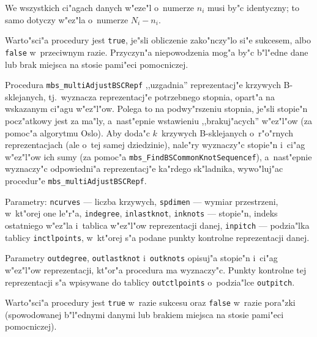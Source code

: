 We wszystkich ci"agach danych w"eze"l o~numerze $n_i$ musi by"c identyczny;
to samo dotyczy w"ez"la o~numerze $N_i-n_i$.

Warto"sci"a procedury jest \texttt{true}, je"sli obliczenie zako"nczy"lo
si"e sukcesem, albo \texttt{false} w~przeciwnym razie. Przyczyn"a
niepowodzenia mog"a by"c b"l"edne dane lub brak miejsca na stosie pami"eci
pomocniczej.

\vspace{\bigskipamount}
\begin{sloppypar}
Procedura \texttt{mbs\_multiAdjustBSCRepf} ,,uzgadnia'' reprezentacj"e
krzywych B-sklejanych, tj.\ wyznacza reprezentacj"e potrzebnego stopnia,
opart"a na wskazanym ci"agu w"ez"l"ow. Polega to na podwy"rszeniu stopnia,
je"sli stopie"n pocz"atkowy jest za ma"ly, a~nast"epnie wstawieniu
,,brakuj"acych'' w"ez"l"ow (za pomoc"a algorytmu Oslo). Aby doda"c
$k$~krzywych B-sklejanych o~r"o"rnych reprezentacjach (ale o~tej samej
dziedzinie), nale"ry wyznaczy"c stopie"n i~ci"ag w"ez"l"ow ich sumy
(za pomoc"a \texttt{mbs\_FindBSCommonKnotSequencef}), a~nast"epnie
wyznaczy"c odpowiedni"a reprezentacj"e ka"rdego sk"ladnika, wywo"luj"ac
procedur"e \texttt{mbs\_multiAdjustBSCRepf}.%
\end{sloppypar}

Parametry: \texttt{ncurves} --- liczba krzywych, \texttt{spdimen} --- wymiar
przestrzeni, w~kt"orej one le"r"a, \texttt{indegree}, \texttt{inlastknot},
\texttt{inknots} --- stopie"n, indeks ostatniego w"ez"la i~tablica w"ez"l"ow
reprezentacji danej, \texttt{inpitch} --- podzia"lka tablicy
\texttt{inctlpoints}, w~kt"orej s"a podane punkty kontrolne reprezentacji
danej.

Parametry \texttt{outdegree}, \texttt{outlastknot} i~\texttt{outknots}
opisuj"a stopie"n i~ci"ag w"ez"l"ow reprezentacji, kt"or"a procedura ma
wyznaczy"c. Punkty kontrolne tej reprezentacji s"a wpisywane do tablicy
\texttt{outctlpoints} o~podzia"lce \texttt{outpitch}.

Warto"sci"a procedury jest \texttt{true} w~razie sukcesu oraz \texttt{false}
w~razie pora"zki (spowodowanej b"l"ednymi danymi lub brakiem miejsca na
stosie pami"eci pomocniczej).

